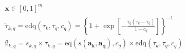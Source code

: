 \documentclass{article}
\begin{document}
\begin{gather}
    \boldsymbol{x} \in [0,1]^{m}\\
    \ddot{\tau}_{k,q} = 
    \text{edq}(\tau_{k}, \tau_{q}, c_{q}) = 
    \left\{
        1 + \exp[-
        \frac{
            \tau_{q}
            (\tau_{k} - \tau_{q})
        }{
            1 - c_{q}
        }
        ]
    \right\} ^ {-1}\\
    \textit{\ss}_{k,q} = 
    \ddot{s}_{k,q}
    \times
    \ddot{\tau}_{k,q} = 
    \text{eq}(s(\boldsymbol{a_k},\boldsymbol{a_q}), c_q)
    \times
    \text{edq}(\tau_{k}, \tau_{q}, c_{q})
\end{gather}
\end{document}
